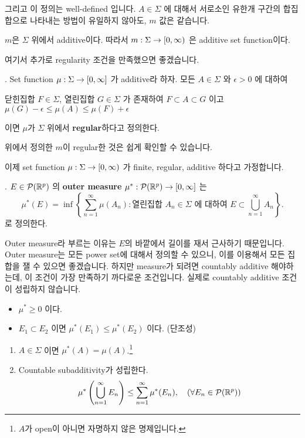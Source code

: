 그리고 이 정의는 well-defined 입니다. \(A \in \Sigma\) 에 대해서 서로소인 유한개 구간의 합집합으로 나타내는 방법이 유일하지 않아도, \(m\) 값은 같습니다.

\rmk \(m\)은 \(\Sigma\) 위에서 additive이다. 따라서 \(m : \Sigma \rightarrow [0, \infty)\) 은 additive set function이다.

여기서 추가로 regularity 조건을 만족했으면 좋겠습니다.

.  Set function \(\mu: \Sigma \rightarrow [0, \infty]\) 가 additive라 하자. 모든 \(A \in \Sigma\) 와 \(\epsilon > 0\) 에 대하여
\begin{center}
    닫힌집합 \(F \in \Sigma\), 열린집합 \(G \in \Sigma\) 가 존재하여 \(F \subset A \subset G\) 이고 \(\mu(G) - \epsilon \leq \mu(A) \leq \mu(F) + \epsilon\)
\end{center}
이면 \(\mu\)가 \(\Sigma\) 위에서 \textbf{regular}하다고 정의한다.

위에서 정의한 \(m\)이 regular한 것은 쉽게 확인할 수 있습니다.

이제 set function \(\mu: \Sigma \rightarrow [0, \infty)\) 가 finite, regular, additive 하다고 가정합니다.

.  \(E \in \mathcal{P}(\mathbb{R}^p)\) 의 \textbf{outer measure} \(\mu^\ast: \mathcal{P}(\mathbb{R}^p) \rightarrow [0, \infty]\) 는
\[
    \mu^\ast(E) = \inf \left\{\sum_{n=1}^\infty \mu(A_n) : \text{열린집합 } A_n \in \Sigma \text{ 에 대하여 } E \subset \bigcup_{n=1}^\infty A_n\right\}.
\]
로 정의한다.

Outer measure라 부르는 이유는 \(E\)의 바깥에서 길이를 재서 근사하기 때문입니다. Outer measure는 모든 power set에 대해서 정의할 수 있으니, 이를 이용해서 모든 집합을 잴 수 있으면 좋겠습니다. 하지만 measure가 되려면 countably additive 해야하는데, 이 조건이 가장 만족하기 까다로운 조건입니다. 실제로 countably additive 조건이 성립하지 않습니다.

\rmk
\begin{itemize}
    \item \(\mu^\ast \geq 0\) 이다.
    \item \(E_1 \subset E_2\) 이면 \(\mu^\ast(E_1) \leq \mu^\ast(E_2)\) 이다. (단조성)
\end{itemize}

\begin{enumerate}
    \item \(A \in \Sigma\) 이면 \(\mu^\ast(A) = \mu(A)\).\footnote{\(A\)가 open이 아니면 자명하지 않은 명제입니다.}
    \item Countable subadditivity가 성립한다.
          \[
              \mu^\ast\left( \bigcup_{n=1}^\infty E_n \right) \leq \sum_{n=1}^\infty \mu^\ast(E_n), \quad (\forall E_n \in \mathcal{P}(\mathbb{R}^p))
          \]
\end{enumerate}

